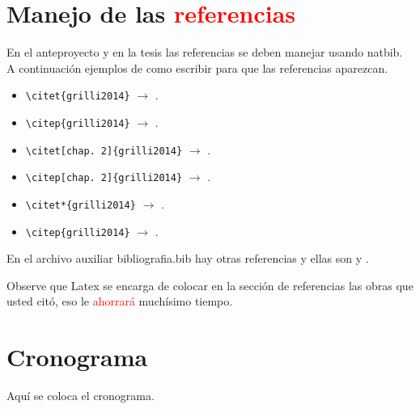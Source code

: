 \documentclass[12pt]{article}
\begin{document}
\section{Manejo de las \textcolor{red}{referencias}}
En el anteproyecto y en la tesis las referencias se deben manejar usando natbib. A continuación ejemplos de como escribir para que las referencias aparezcan.

\begin{itemize}
	\item \verb|\citet{grilli2014}| $\longrightarrow$ \citet{grilli2014}. \\
	\item \verb|\citep{grilli2014}| $\longrightarrow$ \citep{grilli2014}. \\
	\item \verb|\citet[chap. 2]{grilli2014}| $\longrightarrow$ \citet[chap. 2]{grilli2014}. \\
	\item \verb|\citep[chap. 2]{grilli2014}| $\longrightarrow$ \citep[chap. 2]{grilli2014}. \\
	\item \verb|\citet*{grilli2014}| $\longrightarrow$ \citet{grilli2014}. \\
	\item \verb|\citep{grilli2014}| $\longrightarrow$ \citep{grilli2014}. \\
\end{itemize}

En el archivo auxiliar bibliografia.bib hay otras referencias y ellas son \citet{softwareR} y \citet{natbib22}.

Observe que Latex se encarga de colocar en la sección de referencias las obras que usted citó, eso le \textcolor{red}{ahorrará} muchísimo tiempo.
\section{Cronograma}
Aquí se coloca el cronograma.
\end{document}
